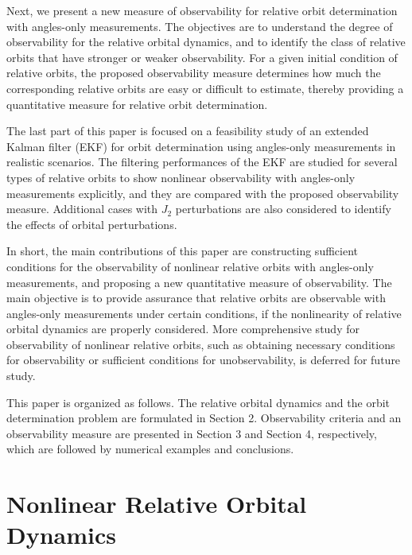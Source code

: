 Next, we present a new measure of observability for relative orbit determination with angles-only measurements. The objectives are to understand the degree of observability for the relative orbital dynamics, and to identify the class of relative orbits that have stronger or weaker observability. For a given initial condition of relative orbits, the proposed observability measure determines how much the corresponding relative orbits are easy or difficult to estimate, thereby providing a quantitative measure for relative orbit determination.

The last part of this paper is focused on a feasibility study of an extended Kalman filter (EKF) for orbit determination using angles-only measurements in realistic scenarios. The filtering performances of the EKF are studied for several types of relative orbits to show nonlinear observability with angles-only measurements explicitly, and they are compared with the proposed observability measure. Additional cases with $J_2$ perturbations are also considered to identify the effects of orbital perturbations. 

In short, the main contributions of this paper are constructing sufficient conditions for the observability of nonlinear relative orbits with angles-only measurements, and proposing a new quantitative measure of observability. The main objective is to provide assurance that relative orbits are observable with angles-only measurements under certain conditions, if the nonlinearity of relative orbital dynamics are properly considered. More comprehensive study for observability of nonlinear relative orbits, such as obtaining necessary conditions for observability or sufficient conditions for unobservability, is deferred for future study. 

This paper is organized as follows. The relative orbital dynamics and the orbit determination problem are formulated in Section 2. Observability criteria and an observability measure are presented in Section 3 and Section 4, respectively, which are followed by numerical examples and conclusions.


\section{Nonlinear Relative Orbital Dynamics}\label{sec:ND}

